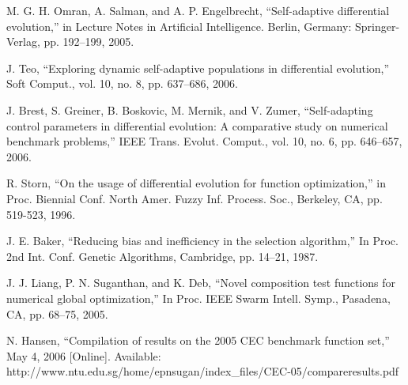 \documentclass[12pt,a4paper]{article}
\theoremstyle{definition}
\theoremstyle{theorem}
\theoremstyle{definition}
\begin{document}
\begin{thebibliography}{99}
\begin{LTRitems}
M. G. H. Omran, A. Salman, and A. P. Engelbrecht, “Self-adaptive differential evolution,” in Lecture Notes in Artificial Intelligence. Berlin, Germany: Springer-Verlag, pp. 192–199, 2005.

J. Teo, “Exploring dynamic self-adaptive populations in differential evolution,” Soft Comput., vol. 10, no. 8, pp. 637–686, 2006.

J. Brest, S. Greiner, B. Boskovic, M. Mernik, and V. Zumer, “Self-adapting control parameters in differential evolution: A comparative study on numerical benchmark problems,” IEEE Trans. Evolut. Comput., vol. 10, no. 6, pp. 646–657, 2006.

R. Storn, “On the usage of differential evolution for function optimization,” in Proc. Biennial Conf. North Amer. Fuzzy Inf. Process. Soc., Berkeley, CA, pp. 519-523, 1996.

J. E. Baker, “Reducing bias and inefficiency in the selection algorithm,” In Proc. 2nd Int. Conf. Genetic Algorithms, Cambridge, pp. 14–21, 1987.

J. J. Liang, P. N. Suganthan, and K. Deb, “Novel composition test functions for numerical global optimization,” In Proc. IEEE Swarm Intell. Symp., Pasadena, CA, pp. 68–75, 2005.

N. Hansen, “Compilation of results on the 2005 CEC benchmark function set,” May 4, 2006 [Online]. Available: http://www.ntu.edu.sg/home/epnsugan/index\_files/CEC-05/compareresults.pdf

\end{LTRitems}

\end{thebibliography}
\end{document}
